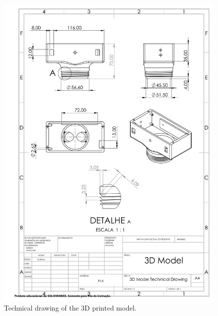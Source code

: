 \begin{figure}[h!]
    \centering
    \includegraphics[scale=0.65]{images/Results/3D_Model_Technical_Drawing.PDF}
    \caption{Technical drawing of the 3D printed model.}
    \label{fig:3dModel}
\end{figure}

